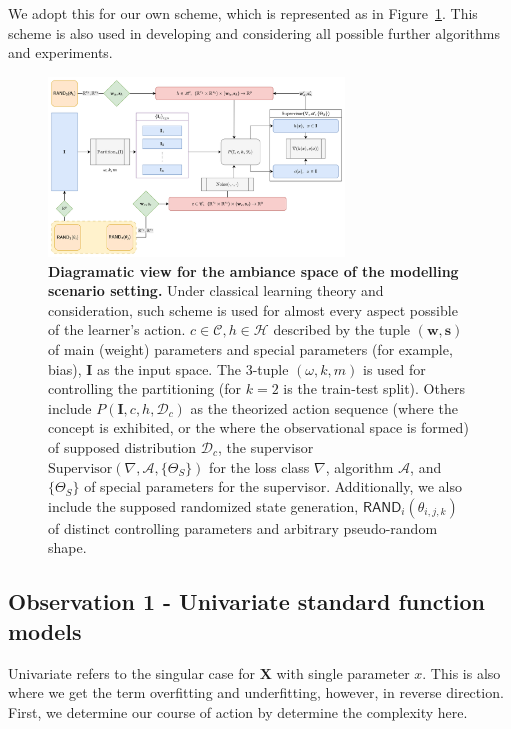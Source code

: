 \documentclass[twoside,10pt]{article}
\begin{document}
We adopt this for our own scheme, which is represented as in Figure~\ref{fig:vapnik_scheme}. This scheme is also used in developing and considering all possible further algorithms and experiments. 
\begin{figure}[htb]
  \centering
  \includegraphics[width=0.7\textwidth]{Diagramatic_Modelling_View.png}
  \caption{\textbf{Diagramatic view for the ambiance space of the modelling scenario setting.} Under classical learning theory and consideration, such scheme is used for almost every aspect possible of the learner's action. $c\in\mathcal{C}, h\in \mathcal{H}$ described by the tuple $(\mathbf{w},\mathbf{s})$ of main (weight) parameters and special parameters (for example, bias), $\mathbf{I}$ as the input space. The 3-tuple $(\omega, k,m)$ is used for controlling the partitioning (for $k=2$ is the train-test split). Others include $P(\mathbf{I},c,h,\mathcal{D}_{c})$ as the theorized action sequence (where the concept is exhibited, or the where the observational space is formed) of supposed distribution $\mathcal{D}_{c}$, the supervisor $\text{Supervisor}(\nabla, \mathcal{A}, \{\Theta_{S}\})$ for the loss class $\nabla$, algorithm $\mathcal{A}$, and $\{\Theta_{S}\}$ of special parameters for the supervisor. Additionally, we also include the supposed randomized state generation, $\mathsf{RAND}_{i}(\theta_{i,j,k})$ of distinct controlling parameters and arbitrary pseudo-random shape.}
  \label{fig:vapnik_scheme}
\end{figure}


\subsection{Observation 1 - Univariate standard function models}

Univariate refers to the singular case for $\mathbf{X}$ with single parameter $x$. This is also where we get the term overfitting and underfitting, however, in reverse direction. First, we determine our course of action by determine the complexity here. 
\end{document}

